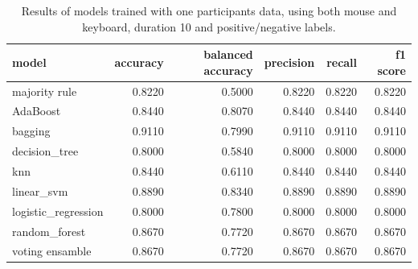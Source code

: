 \begin{table}[!h]
    \centering
    \begin{tabular}{lrrrrr}
        \toprule
                       model &  accuracy &  balanced accuracy &  precision &  recall &  f1 score \\
        \midrule
               majority rule &    0.8220 &             0.5000 &     0.8220 &  0.8220 &    0.8220 \\
                    AdaBoost &    0.8440 &             0.8070 &     0.8440 &  0.8440 &    0.8440 \\
                     bagging &    0.9110 &             0.7990 &     0.9110 &  0.9110 &    0.9110 \\
               decision\_tree &    0.8000 &             0.5840 &     0.8000 &  0.8000 &    0.8000 \\
                         knn &    0.8440 &             0.6110 &     0.8440 &  0.8440 &    0.8440 \\
                  linear\_svm &    0.8890 &             0.8340 &     0.8890 &  0.8890 &    0.8890 \\
         logistic\_regression &    0.8000 &             0.7800 &     0.8000 &  0.8000 &    0.8000 \\
               random\_forest &    0.8670 &             0.7720 &     0.8670 &  0.8670 &    0.8670 \\
             voting ensamble &    0.8670 &             0.7720 &     0.8670 &  0.8670 &    0.8670 \\
        \bottomrule
    \end{tabular}
    \caption{Results of models trained with one participants data, using both mouse and keyboard, duration 10 and positive/negative labels.}                     
\end{table}

